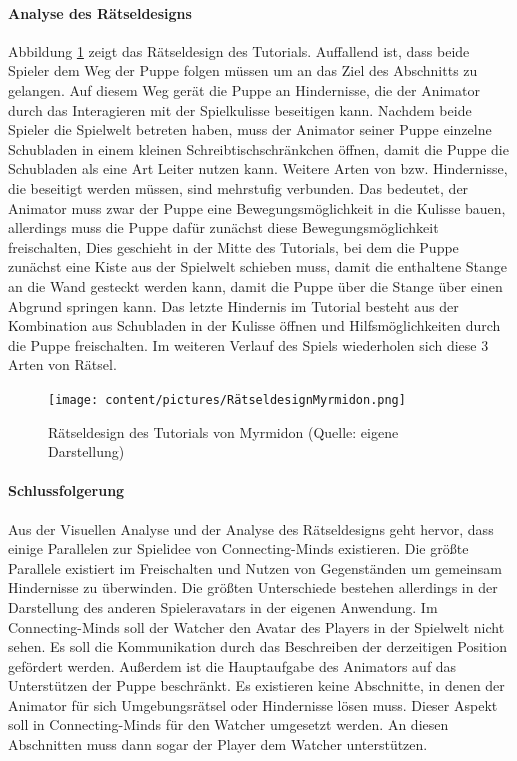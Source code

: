 \paragraph{Analyse des Rätseldesigns}
Abbildung \ref{fig:myrmidon-uml} zeigt das Rätseldesign des Tutorials. Auffallend ist, dass beide Spieler dem Weg der Puppe folgen müssen um an das Ziel des Abschnitts zu gelangen. Auf diesem Weg gerät die Puppe an Hindernisse, die der Animator durch das Interagieren mit der Spielkulisse beseitigen kann. Nachdem beide Spieler die Spielwelt betreten haben, muss der Animator seiner Puppe einzelne Schubladen in einem kleinen Schreibtischschränkchen öffnen, damit die Puppe die Schubladen als eine Art Leiter nutzen kann. Weitere Arten von  bzw. Hindernisse, die beseitigt werden müssen, sind mehrstufig verbunden. Das bedeutet, der Animator muss zwar der Puppe eine Bewegungsmöglichkeit in die Kulisse bauen, allerdings muss die Puppe dafür zunächst diese Bewegungsmöglichkeit freischalten, Dies geschieht in der Mitte des Tutorials, bei dem die Puppe zunächst eine Kiste aus der Spielwelt schieben muss, damit die enthaltene Stange an die Wand gesteckt werden kann, damit die Puppe über die Stange über einen Abgrund springen kann.
Das letzte Hindernis im Tutorial besteht aus der Kombination aus Schubladen in der Kulisse öffnen und Hilfsmöglichkeiten durch die Puppe freischalten. Im weiteren Verlauf des Spiels wiederholen sich diese 3 Arten von Rätsel. 
\begin{figure}[ht]
\centering
\texttt{[image: content/pictures/RätseldesignMyrmidon.png]}
\caption{Rätseldesign des Tutorials von Myrmidon (Quelle: eigene Darstellung)}
\label{fig:myrmidon-uml}
\end{figure}

\paragraph{Schlussfolgerung}
Aus der Visuellen Analyse und der Analyse des Rätseldesigns geht hervor, dass einige Parallelen zur Spielidee von Connecting-Minds existieren. Die größte Parallele existiert im Freischalten und Nutzen von Gegenständen um gemeinsam Hindernisse zu überwinden. Die größten Unterschiede bestehen allerdings in der Darstellung des anderen Spieleravatars in der eigenen Anwendung. Im Connecting-Minds soll der Watcher den Avatar des Players in der Spielwelt nicht sehen. Es soll die Kommunikation durch das Beschreiben der derzeitigen Position gefördert werden. Außerdem ist die Hauptaufgabe des Animators auf das Unterstützen der Puppe beschränkt. Es existieren keine Abschnitte, in denen der Animator für sich Umgebungsrätsel oder Hindernisse lösen muss. Dieser Aspekt soll in Connecting-Minds für den Watcher umgesetzt werden. An diesen Abschnitten muss dann sogar der Player dem Watcher unterstützen. 

